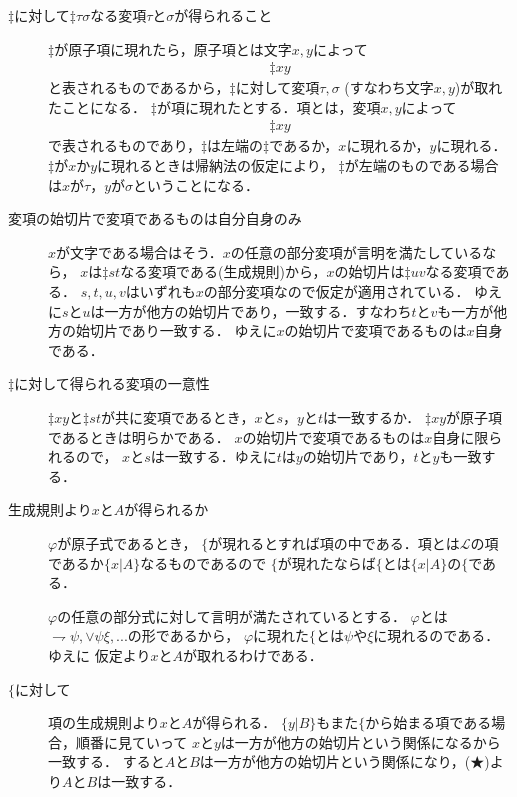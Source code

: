 \documentclass[a4j,10.5pt,oneside,openany]{jsbook}
\begin{document}
	\begin{description}
		\item[$\ddagger$に対して$\ddagger \tau \sigma$なる変項$\tau$と$\sigma$が得られること]
			$\ddagger$が原子項に現れたら，原子項とは文字$x,y$によって
			\begin{align}
				\ddagger xy
			\end{align}
			と表されるものであるから，$\ddagger$に対して変項$\tau,\sigma$ (すなわち文字$x,y$)が取れたことになる．
			$\ddagger$が項に現れたとする．項とは，変項$x,y$によって
			\begin{align}
				\ddagger xy
			\end{align}
			で表されるものであり，$\ddagger$は左端の$\ddagger$であるか，$x$に現れるか，$y$に現れる．
			$\ddagger$が$x$か$y$に現れるときは帰納法の仮定により，
			$\ddagger$が左端のものである場合は$x$が$\tau$，$y$が$\sigma$ということになる．
			
		\item[変項の始切片で変項であるものは自分自身のみ]
			$x$が文字である場合はそう．$x$の任意の部分変項が言明を満たしているなら，
			$x$は$\ddagger st$なる変項である(生成規則)から，$x$の始切片は$\ddagger uv$なる変項である．
			$s,t,u,v$はいずれも$x$の部分変項なので仮定が適用されている．
			ゆえに$s$と$u$は一方が他方の始切片であり，一致する．すなわち$t$と$v$も一方が他方の始切片であり一致する．
			ゆえに$x$の始切片で変項であるものは$x$自身である．
			
		\item[$\ddagger$に対して得られる変項の一意性]
			$\ddagger xy$と$\ddagger st$が共に変項であるとき，$x$と$s$，$y$と$t$は一致するか．
			$\ddagger xy$が原子項であるときは明らかである．
			$x$の始切片で変項であるものは$x$自身に限られるので，
			$x$と$s$は一致する．ゆえに$t$は$y$の始切片であり，$t$と$y$も一致する．
		
		\item[生成規則より$x$と$A$が得られるか]
			$\varphi$が原子式であるとき，
			$\{$が現れるとすれば項の中である．項とは$\mathcal{L}$の項であるか$\{x|A\}$なるものであるので
			$\{$が現れたならば$\{$とは$\{x|A\}$の$\{$である．
			
			$\varphi$の任意の部分式に対して言明が満たされているとする．
			$\varphi$とは$\rightharpoondown \psi,\vee \psi \xi,...$の形であるから，
			$\varphi$に現れた$\{$とは$\psi$や$\xi$に現れるのである．ゆえに
			仮定より$x$と$A$が取れるわけである．
			
		\item[$\{$に対して]
			項の生成規則より$x$と$A$が得られる．
			$\{y|B\}$もまた$\{$から始まる項である場合，順番に見ていって
			$x$と$y$は一方が他方の始切片という関係になるから一致する．
			すると$A$と$B$は一方が他方の始切片という関係になり，(★)より$A$と$B$は一致する．
			

\end{description}
\end{document}
